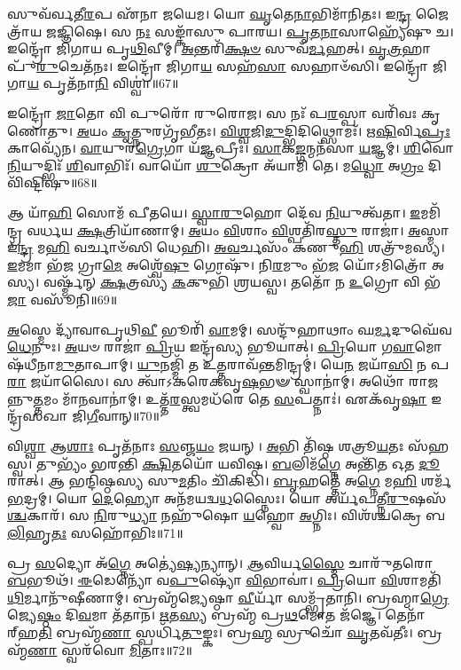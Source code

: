 𑌸𑍁𑌵᳴𑌰𑍍𑌵𑌤𑍀\-\ul{𑌰}\-𑌪 𑌏᳴𑌨𑌾 𑌜𑌯𑍇𑌮।
𑌯𑍋 \ul{𑌘𑍃}\-𑌤𑍇\-\ul{𑌨𑌾}\-𑌭𑌿𑌮𑌾᳴𑌨𑌿𑌤𑌃।
𑌇\-\ul{𑌨𑍍𑌦𑍍𑌰} 𑌜𑍈𑌤𑍍𑌰𑌾᳴𑌯 𑌜𑌜𑍍𑌞𑌿𑌷𑍇।
𑌸 \ul{𑌨𑌃} 𑌸𑌙𑍍𑌕𑌾᳴𑌸𑍁 𑌪𑌾𑌰𑌯।
\-\ul{𑌪𑍃}\-\-\ul{𑌤}\-\-\ul{𑌨𑌾}\-𑌸𑌾𑌹𑍍𑌯𑍇᳴𑌷𑍁 𑌚।
𑌇𑌨𑍍𑌦𑍍𑌰𑍋᳴ 𑌜𑌿𑌗𑌾𑌯 𑌪𑍃\-\ul{𑌥𑌿}\-𑌵𑍀𑌮𑍍।
\-\ul{𑌅}\-𑌨𑍍𑌤𑌰𑌿᳴\-\ul{𑌕𑍍𑌷}\-\-\ul{𑍞} 𑌸𑍁𑌵᳴\-\ul{𑌰𑍍𑌮}\-𑌹𑌤𑍍।
\-\ul{𑌵𑍃}\-\-\ul{𑌤𑍍𑌰}\-𑌹𑌾 𑌪𑍁᳴\-\ul{𑌰𑍁}\-𑌚𑍇𑌤᳴𑌨𑌃।
𑌇𑌨𑍍𑌦𑍍𑌰𑍋᳴ 𑌜𑌿𑌗𑌾\-\ul{𑌯} 𑌸𑌹᳴\-\ul{𑌸𑌾} 𑌸𑌹𑌾𑍞᳴𑌸𑌿।
𑌇𑌨𑍍𑌦𑍍𑌰𑍋᳴ 𑌜𑌿𑌗𑌾\-\ul{𑌯} 𑌪𑍃𑌤᳴𑌨𑌾\-\ul{𑌨𑌿} 𑌵𑌿𑌶𑍍𑌵𑌾॑॥67॥

𑌇𑌨𑍍𑌦𑍍𑌰𑍋᳴ \ul{𑌜𑌾}\-𑌤𑍋 𑌵𑌿 𑌪𑍁𑌰𑍋᳴ 𑌰𑍁𑌰𑍋𑌜।
𑌸 𑌨𑌃᳴ 𑌪\-\ul{𑌰}\-𑌸𑍍𑌪𑌾 𑌵𑌰𑌿᳴𑌵𑌃 𑌕𑍃𑌣𑍋𑌤𑍁।
\-\ul{𑌅}\-𑌯𑌂 \ul{𑌕𑍃}\-𑌤𑍍𑌨𑍁𑌰𑌗𑍃᳴𑌭𑍀𑌤𑌃।
\-\ul{𑌵𑌿}\-\-\ul{𑌶𑍍𑌵}\-𑌜𑌿\-\ul{𑌦𑍁}\-𑌦𑍍𑌭𑌿𑌦𑌿𑌥𑍍𑌸𑍋𑌮𑌃᳴।
𑌋\-\ul{𑌷𑌿}\-𑌰𑍍𑌵𑌿\-\ul{𑌪𑍍𑌰𑌃} 𑌕𑌾𑌵𑍍𑌯𑍇᳴𑌨।
\-\ul{𑌵𑌾}\-𑌯𑍁𑌰᳴\-\ul{𑌗𑍍𑌰𑍇}\-𑌗𑌾 𑌯᳴\-\ul{𑌜𑍍𑌞}\-𑌪𑍍𑌰𑍀𑌃।
\-\ul{𑌸𑌾}\-𑌕\-\ul{𑌙𑍍𑌗}\-𑌨𑍍𑌮𑌨᳴𑌸𑌾 \ul{𑌯}\-𑌜𑍍𑌞𑌮𑍍।
\-\ul{𑌶𑌿}\-𑌵𑍋 \ul{𑌨𑌿}\-𑌯𑍁𑌦𑍍𑌭𑌿𑌃᳴ \ul{𑌶𑌿}\-𑌵𑌾𑌭𑌿𑌃᳴।
𑌵𑌾𑌯𑍋᳴ \ul{𑌶𑍁}\-𑌕𑍍𑌰𑍋 𑌅᳴𑌯𑌾𑌮𑌿 𑌤𑍇।
𑌮\-\ul{𑌧𑍍𑌵𑍋} 𑌅\-\ul{𑌗𑍍𑌰𑌂} 𑌦𑌿𑌵𑌿᳴𑌷𑍍𑌟𑌿𑌷𑍁॥68॥

𑌆 𑌯𑌾᳴\-\ul{𑌹𑌿} 𑌸𑍋𑌮᳴ 𑌪𑍀𑌤𑌯𑍇।
\-\ul{𑌸𑍍𑌵𑌾}\-\-\ul{𑌰𑍁}\-𑌹𑍋 𑌦𑍇᳴𑌵 \ul{𑌨𑌿}\-𑌯𑍁𑌤𑍍𑌵᳴𑌤𑌾।
\-\ul{𑌇}\-𑌮𑌮𑌿᳴𑌨𑍍𑌦𑍍𑌰 𑌵𑌰𑍍𑌧𑌯 \ul{𑌕𑍍𑌷}\-𑌤𑍍𑌰𑌿𑌯𑌾᳴𑌣𑌾𑌮𑍍।
\-\ul{𑌅}\-𑌯𑌂 \ul{𑌵𑌿}\-𑌶𑌾𑌂 \ul{𑌵𑌿}\-𑌶𑍍𑌪𑌤𑌿᳴𑌰\-\ul{𑌸𑍍𑌤𑍁} 𑌰𑌾𑌜𑌾॑।
\-\ul{𑌅}\-𑌸𑍍𑌮𑌾 𑌇᳴\-\ul{𑌨𑍍𑌦𑍍𑌰} 𑌮\-\ul{𑌹𑌿} 𑌵𑌰𑍍𑌚𑌾𑍞᳴𑌸𑌿 𑌧𑍇𑌹𑌿।
\-\ul{𑌅}\-\-\ul{𑌵}\-𑌰𑍍𑌚𑌸𑌂᳴ 𑌕𑌣𑍁\-\ul{𑌹𑌿} 𑌶𑌤𑍍𑌰𑍁᳴𑌮𑌸𑍍𑌯।
\-\ul{𑌇}\-𑌮𑌮𑌾 𑌭᳴\-\ul{𑌜} 𑌗𑍍𑌰𑌾\-\ul{𑌮𑍇} 𑌅𑌶𑍍𑌵𑍇᳴\-\ul{𑌷𑍁} 𑌗𑍋𑌷𑍁᳴।
𑌨𑌿\-\ul{𑌰}\-𑌮𑍁𑌂 𑌭᳴\-\ul{𑌜} 𑌯𑍋᳴\-𑌽𑌮𑌿𑌤𑍍𑌰𑍋᳴ 𑌅𑌸𑍍𑌯।
𑌵𑌰𑍍𑌷𑍍𑌮᳴𑌨𑍍 \ul{𑌕𑍍𑌷}\-𑌤𑍍𑌰𑌸𑍍𑌯᳴ \ul{𑌕}\-𑌕𑍁𑌭𑌿᳴ 𑌶𑍍𑌰𑌯𑌸𑍍𑌵।
𑌤𑌤𑍋᳴ 𑌨 \ul{𑌉}\-𑌗𑍍𑌰𑍋 𑌵𑌿 𑌭᳴\-\ul{𑌜𑌾} 𑌵𑌸𑍂᳴𑌨𑌿॥69॥

\-\ul{𑌅}\-𑌸𑍍𑌮𑍇 𑌦𑍍𑌯𑌾᳴𑌵𑌾𑌪𑍃𑌥𑌿\-\ul{𑌵𑍀} 𑌭𑍂𑌰𑌿᳴ \ul{𑌵𑌾}\-𑌮𑌮𑍍।
𑌸𑌨𑍍𑌦𑍁᳴𑌹𑌾𑌥𑌾𑌂 𑌘\-\ul{𑌰𑍍𑌮}\-𑌦𑍁𑌘𑍇᳴𑌵 \ul{𑌧𑍇}\-𑌨𑍁𑌃।
\-\ul{𑌅}\-𑌯𑍞 𑌰𑌾𑌜𑌾॑ \ul{𑌪𑍍𑌰𑌿}\-𑌯 𑌇𑌨𑍍𑌦𑍍𑌰᳴𑌸𑍍𑌯 𑌭𑍂𑌯𑌾𑌤𑍍।
\-\ul{𑌪𑍍𑌰𑌿}\-𑌯𑍋 𑌗\-\ul{𑌵𑌾}\-𑌮𑍋𑌷᳴𑌧𑍀𑌨𑌾\-\ul{𑌮𑍁}\-𑌤𑌾𑌪𑌾𑌮𑍍।
\-\ul{𑌯𑍁}\-𑌨𑌜𑍍𑌮𑌿᳴ 𑌤 𑌉\-\ul{𑌤𑍍𑌤}\-𑌰𑌾𑌵᳴\-\ul{𑌨𑍍𑌤}\-𑌮𑌿𑌨𑍍𑌦𑍍𑌰𑌮𑍍॑।
𑌯𑍇\-\ul{𑌨} 𑌜𑌯𑌾᳴\-\ul{𑌸𑌿} 𑌨 𑌪\-\ul{𑌰𑌾} 𑌜𑌯𑌾᳴𑌸𑍈।
𑌸 𑌤𑍍𑌵𑌾᳴\-𑌽𑌕𑌰𑍇𑌕𑌵𑍃\-\ul{𑌷}\-𑌭𑍟 𑌸𑍍𑌵𑌾𑌨𑌾॑𑌮𑍍।
𑌅𑌥𑍋᳴ 𑌰𑌾𑌜𑌨𑍍𑌨𑍁\-\ul{𑌤𑍍𑌤}\-𑌮𑌂 𑌮𑌾᳴\-\ul{𑌨}\-𑌵𑌾𑌨𑌾॑𑌮𑍍।
𑌉𑌤𑍍𑌤᳴\-\ul{𑌰}\-𑌸𑍍𑌤𑍍𑌵𑌮𑌧᳴𑌰𑍇 𑌤𑍇 \ul{𑌸}\-𑌪𑌤𑍍𑌨𑌾𑌃॑।
𑌏𑌕᳴𑌵𑍃\-\ul{𑌷𑌾} 𑌇𑌨𑍍𑌦𑍍𑌰᳴𑌸𑌖𑌾 𑌜𑌿\-\ul{𑌗𑍀}\-𑌵𑌾𑌨𑍍॥70॥

𑌵𑌿\-\ul{𑌶𑍍𑌵𑌾} 𑌆\-\ul{𑌶𑌾𑌃} 𑌪𑍃𑌤᳴𑌨𑌾𑌃 \ul{𑌸}\-𑌞𑍍𑌜\-\ul{𑌯𑌂} 𑌜𑌯𑌨𑍍।
\-\ul{𑌅}\-𑌭𑌿 𑌤𑌿᳴𑌷𑍍𑌠 𑌶𑌤𑍍𑌰𑍂\-\ul{𑌯}\-𑌤𑌃 𑌸᳴𑌹𑌸𑍍𑌵।
𑌤𑍁𑌭𑍍𑌯𑌂᳴ 𑌭𑌰𑌨𑍍𑌤𑌿 \ul{𑌕𑍍𑌷𑌿}\-𑌤𑌯𑍋᳴ 𑌯𑌵𑌿𑌷𑍍𑌠।
\-\ul{𑌬}\-𑌲𑌿𑌮᳴\-\ul{𑌗𑍍𑌨𑍇} 𑌅𑌨𑍍𑌤𑌿᳴\-\ul{𑌤} 𑌓𑌤 \ul{𑌦𑍂}\-𑌰𑌾𑌤𑍍।
𑌆 𑌭𑌨𑍍𑌦𑌿᳴𑌷𑍍𑌠𑌸𑍍𑌯 𑌸𑍁\-\ul{𑌮}\-𑌤𑌿𑌂 𑌚𑌿᳴𑌕𑌿𑌦𑍍𑌧𑌿।
\-\ul{𑌬𑍃}\-𑌹𑌤𑍍𑌤𑍇᳴ 𑌅\-\ul{𑌗𑍍𑌨𑍇} 𑌮\-\ul{𑌹𑌿} 𑌶𑌰𑍍𑌮᳴ \ul{𑌭}\-𑌦𑍍𑌰𑌮𑍍।
𑌯𑍋 \ul{𑌦𑍇}\-𑌹𑍍𑌯𑍋 𑌅𑌨᳴𑌮𑌯𑌦𑍍𑌵\-\ul{𑌧}\-𑌸𑍍𑌨𑍈𑌃।
𑌯𑍋 𑌅𑌰𑍍𑌯᳴𑌪𑌤𑍍𑌨𑍀\-\ul{𑌰𑍁}\-𑌷𑌸᳴\-\ul{𑌶𑍍𑌚}\-𑌕𑌾𑌰᳴।
𑌸 \ul{𑌨𑌿}\-𑌰𑍁\-\ul{𑌧𑍍𑌯𑌾} 𑌨𑌹𑍁᳴𑌷𑍋 \ul{𑌯}\-𑌹𑍍𑌵𑍋 \ul{𑌅}\-𑌗𑍍𑌨𑌿𑌃।
𑌵𑌿𑌶᳴𑌶𑍍𑌚𑌕𑍍𑌰𑍇 𑌬\-\ul{𑌲𑌿}\-𑌹𑍃\-\ul{𑌤𑌃} 𑌸𑌹𑍋᳴𑌭𑌿𑌃॥71॥

𑌪𑍍𑌰 \ul{𑌸}\-𑌦𑍍𑌯𑍋 𑌅᳴\-\ul{𑌗𑍍𑌨𑍇} 𑌅𑌤𑍍𑌯𑍇॑\-\ul{𑌷𑍍𑌯}\-𑌨𑍍𑌯𑌾𑌨𑍍।
\-\ul{𑌆}\-𑌵𑌿𑌰𑍍𑌯\-\ul{𑌸𑍍𑌮𑍈} 𑌚𑌾𑌰𑍁᳴𑌤𑌰𑍋 \ul{𑌬}\-𑌭𑍂𑌥᳴।
\-\ul{𑌈}\-𑌡𑍇𑌨𑍍𑌯𑍋᳴ 𑌵\-\ul{𑌪𑍁}\-𑌷𑍍𑌯𑍋᳴ \ul{𑌵𑌿}\-𑌭𑌾𑌵𑌾॑।
\-\ul{𑌪𑍍𑌰𑌿}\-𑌯𑍋 \ul{𑌵𑌿}\-𑌶𑌾𑌮𑌤𑌿᳴\-\ul{𑌥𑌿}\-𑌰𑍍𑌮𑌾𑌨𑍁᳴𑌷𑍀𑌣𑌾𑌮𑍍।
𑌬𑍍𑌰𑌹𑍍𑌮᳴𑌜𑍍𑌯𑍇𑌷𑍍𑌠𑌾 \ul{𑌵𑍀}\-𑌰𑍍𑌯𑌾᳴ 𑌸𑌮𑍍𑌭𑍃᳴𑌤𑌾𑌨𑌿।
𑌬𑍍𑌰𑌹𑍍𑌮𑌾\-\ul{𑌗𑍍𑌰𑍇} 𑌜𑍍𑌯𑍇\-\ul{𑌷𑍍𑌠𑌂} 𑌦𑌿\-\ul{𑌵}\-𑌮𑌾 𑌤᳴𑌤𑌾𑌨।
\-\ul{𑌋}\-𑌤\-\ul{𑌸𑍍𑌯} 𑌬𑍍𑌰𑌹𑍍𑌮᳴ 𑌪𑍍𑌰\-\ul{𑌥}\-𑌮𑍋𑌤 𑌜᳴𑌜𑍍𑌞𑍇।
𑌤𑍇𑌨𑌾᳴𑌰𑍍‌\mbox{}𑌹\-\ul{𑌤𑌿} 𑌬𑍍𑌰𑌹𑍍𑌮᳴\-\ul{𑌣𑌾} 𑌸𑍍𑌪𑌰𑍍𑌧𑌿᳴\-\ul{𑌤𑍁}\-𑌙𑍍𑌕𑌃।
𑌬𑍍𑌰\-\ul{𑌹𑍍𑌮} 𑌸𑍍𑌰𑍁𑌚𑍋᳴ \ul{𑌘𑍃}\-𑌤𑌵᳴𑌤𑍀𑌃।
𑌬𑍍𑌰𑌹𑍍𑌮᳴\-\ul{𑌣𑌾} 𑌸𑍍𑌵𑌰᳴𑌵𑍋 \ul{𑌮𑌿}\-𑌤𑌾𑌃॥72॥

